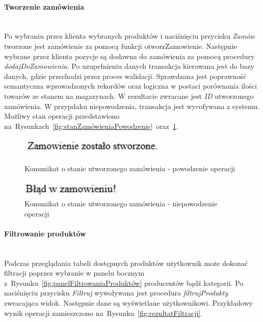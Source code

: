 \documentclass[a4paper, 12pt]{article}
\begin{document}
\paragraph{Tworzenie zamówienia} \mbox{}\\
Po wybraniu przez klienta wybranych produktów i naciśnięciu przycisku \textit{Zamów} tworzone jest zamówienie za pomocą funkcji otworzZamowienie. Następnie wybrane przez klienta pozycje są dodawna do zamówienia za pomocą procedury \textit{dodajDoZamowienia}. Po uzupełnieniu danych transakcja kierowana jest do bazy danych, gdzie przechodzi przez proces walidacji. Sprawdzana jest poprawność semantyczna wprowadzonych rekordów oraz logiczna w postaci porównania ilości towarów ze stanem na magazynach. W rezultacie zwracane jest \textit{ID} utworzonego zamówienia. W przypdaku niepowodzenia, transakcja jest wycofywana z systemu. Możliwy stan operacji przedstawiono na~Rysunkach~\ref{fig:stanZamówieniaPowodzenie}~oraz~\ref{fig:stanZamówieniaNiepowodzenie}.

\begin{figure}[H]
	\centering
	\includegraphics[width=7cm]{Screeny/ZamowieniePoprawne.JPG}
	\caption[Stan zamówienia - powodzenie operacji]{Komunikat o stanie utworzonego zamówienia - powodzenie operacji}
	\label{fig:stanZamówieniaPowodzenie}

	\includegraphics[width=5cm]{Screeny/ZamowienieNiepoprawne.JPG}
	\caption[Stan zamówienia - niepowodzenie operacji]{Komunikat o stanie utworzonego zamówienia - niepowodzenie operacji}
	\label{fig:stanZamówieniaNiepowodzenie}
\end{figure}
\paragraph{Filtrowanie produktów} \mbox{}\\
Podczas przeglądania tabeli dostępnych produktów użytkownik może dokonać filtracji poprzez wybranie w panelu bocznym z~Rysunku~\ref{fig:panelFiltrowaniaProduktów} producentów bądź kategorii. Po naciśnięciu przycisku \textit{Filtruj} wywoływana jest procedura \textit{filtrujProdukty} zwracająca widok. Następnie dane są wyświetlane użytkownikowi. Przykładowy wynik operacji zamieszczono na~Rysunku~\ref{fig:rezultatFiltracji}.
\end{document}
